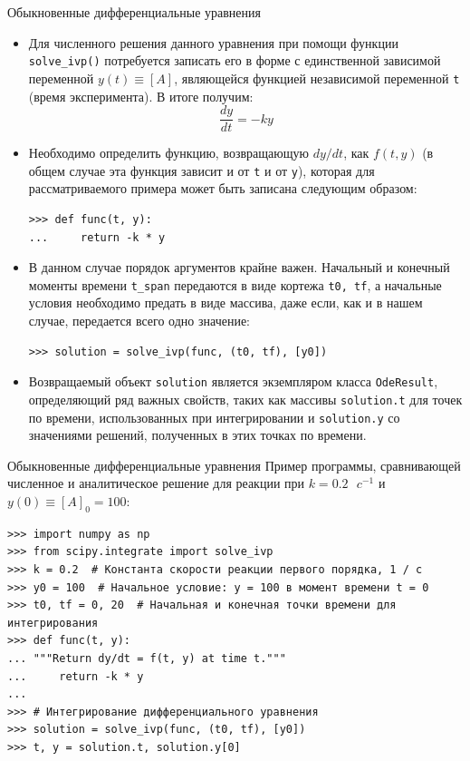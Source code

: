 \documentclass[aspectratio=169, mathserif]{beamer}	%
\begin{document}
\begin{frame}[fragile, label=c]{Обыкновенные дифференциальные уравнения}
\scriptsize
\begin{itemize}
	\item Для численного решения данного уравнения при помощи функции \texttt{solve\_ivp()} потребуется записать его в форме с единственной зависимой переменной $y(t) \equiv \left[A\right]$, являющейся функцией независимой переменной \texttt{t} (время эксперимента). В итоге получим:
\vfill
$$
	\dfrac{dy}{dt} = -ky
$$
\vfill
	\item Необходимо определить функцию, возвращающую $dy/dt$, как $f(t, y)$ (в общем случае эта функция зависит и от \texttt{t} и от \texttt{y}), которая для рассматриваемого примера может быть записана следующим образом:
\vfill
\begin{verbatim}
>>> def func(t, y):
...     return -k * y
\end{verbatim}
\vfill
	\item 	В данном случае порядок аргументов крайне важен. Начальный и конечный моменты времени \texttt{t\_span} передаются в виде кортежа \texttt{t0, tf}, а начальные условия необходимо предать в виде массива, даже если, как и в нашем случае, передается всего одно значение:
\vfill
\begin{verbatim}
>>> solution = solve_ivp(func, (t0, tf), [y0])
\end{verbatim}
\vfill
	\item Возвращаемый объект \texttt{solution} является экземпляром класса \texttt{OdeResult}, определяющий ряд важных свойств, таких как массивы \texttt{solution.t} для точек по времени, использованных при интегрировании и \texttt{solution.y} со значениями решений, полученных в этих точках по времени.
\end{itemize}
\vfill
\end{frame}

\begin{frame}[fragile, label=c]{Обыкновенные дифференциальные уравнения}
\scriptsize
Пример программы, сравнивающей численное и аналитическое решение для реакции при $k = 0.2 \text{ } c^{-1}$ и $y(0) \equiv \left[A\right]_0 = 100$:
\vfill
\begin{verbatim}
>>> import numpy as np
>>> from scipy.integrate import solve_ivp
>>> k = 0.2  # Константа скорости реакции первого порядка, 1 / с
>>> y0 = 100  # Начальное условие: y = 100 в момент времени t = 0
>>> t0, tf = 0, 20  # Начальная и конечная точки времени для интегрирования
>>> def func(t, y):
... """Return dy/dt = f(t, y) at time t."""
...     return -k * y
...
>>> # Интегрирование дифференциального уравнения
>>> solution = solve_ivp(func, (t0, tf), [y0])
>>> t, y = solution.t, solution.y[0]
\end{verbatim}
\vfill
\end{frame}
\end{document}
